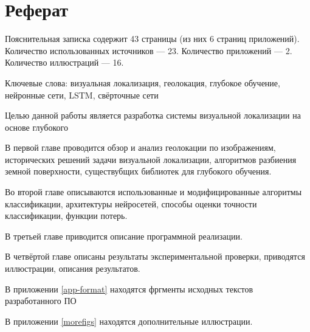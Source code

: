 \chapter*{Реферат}
\thispagestyle{plain}

Пояснительная записка содержит 43 страницы (из них 6 страниц приложений).   Количество использованных источников --- 23. Количество приложений --- 2. Количество иллюстраций --- 16.

Ключевые слова: визуальная локализация, геолокация, глубокое обучение, нейронные сети, LSTM, свёрточные сети

Целью данной работы является разработка системы визуальной локализации на основе глубокого  

В первой главе проводится обзор и анализ геолокации по изображениям, исторических решений задачи визуальной локализации,
алгоритмов разбиения земной поверхности, существубщих библиотек для глубокого обучения.

Во второй главе описываются использованные и модифицированные алгоритмы классификации, архитектуры нейросетей, способы оценки точности классификации, функции потерь.

В третьей главе приводится описание программной реализации.

В четвёртой главе описаны результаты экспериментальной проверки, 
приводятся иллюстрации, описания результатов.

В приложении \ref{app-format} находятся фргменты исходных текстов разработанного ПО

В приложении \ref{morefigs} находятся дополнительные иллюстрации.